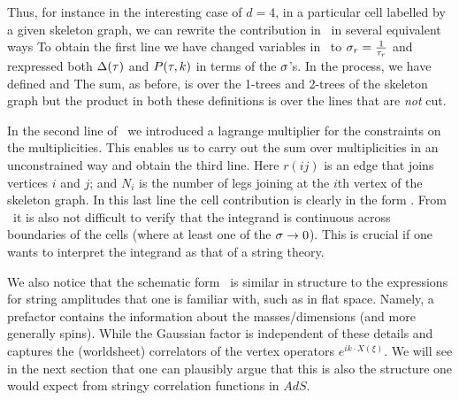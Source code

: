 Thus, for instance in the interesting case of $d=4$, 
in a particular cell labelled by a given skeleton graph, 
we can rewrite the contribution in \totcont\ in several equivalent ways
\eqn{}
To obtain the first line we have changed variables in \totcont\ to 
${\sigma}_r={1\over {\tau}_r}$ and rexpressed both ${\Delta}({\tau})$ and $P({\tau},k)$ in terms 
of the ${\sigma}$'s. In the process, we have defined 
\eqn{}
and 
\eqn{}
The sum, as before, is over the 1-trees and 2-trees of the skeleton graph
but the product in both these 
definitions is over the lines that are {\it not} cut.

In the second line of \cellcont\ we introduced a lagrange multiplier for
the constraints on the multiplicities. This enables us to carry out the sum 
over multiplicities in an unconstrained way and obtain the third line.
Here $r(ij)$ is an edge that joins vertices $i$ and $j$; and $N_i$ is the number 
of legs joining at the $i$th vertex of the skeleton graph. In this last line 
the cell contribution is clearly in the form \scalstr . From \cellcont\
it is also not difficult to verify that the integrand is continuous 
across boundaries of the cells (where at least one of the ${\sigma}\rightarrow 0$).
This is crucial if one wants to interpret the integrand as that of 
a string theory. 

We also notice that the schematic form \scalstr\ is 
similar in structure to the expressions for string 
amplitudes that one is familiar 
with, such as in flat space. Namely, a prefactor contains
the information about the 
masses/dimensions (and more generally spins). While the Gaussian factor is 
independent of these details and captures the (worldsheet) correlators of the 
vertex operators $e^{ik\cdot X(\xi)}$. We will see in the next section that one
can plausibly argue that this is also the structure one would expect from stringy
correlation functions in $AdS$.  

